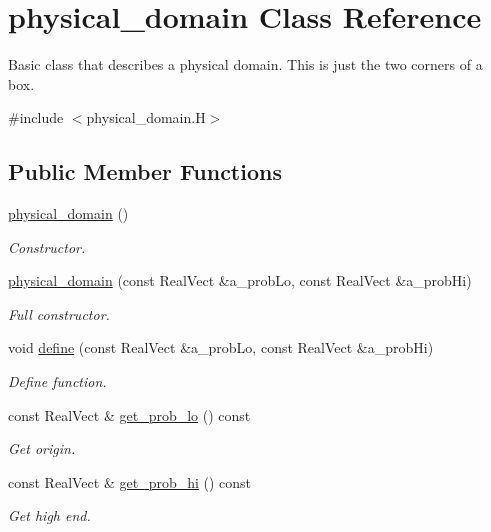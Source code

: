 \hypertarget{classphysical__domain}{}\section{physical\+\_\+domain Class Reference}
\label{classphysical__domain}


Basic class that describes a physical domain. This is just the two corners of a box.  




{\ttfamily \#include $<$physical\+\_\+domain.\+H$>$}

\subsection*{Public Member Functions}
\begin{DoxyCompactItemize}
\item 
\hyperlink{classphysical__domain_a23acf3aefa6dca5518437ede8a053967}{physical\+\_\+domain} ()
\begin{DoxyCompactList}\small\item\em Constructor. \end{DoxyCompactList}\item 
\hyperlink{classphysical__domain_a731464bfb5b2447ab9f5688989a9f633}{physical\+\_\+domain} (const Real\+Vect \&a\+\_\+prob\+Lo, const Real\+Vect \&a\+\_\+prob\+Hi)
\begin{DoxyCompactList}\small\item\em Full constructor. \end{DoxyCompactList}\item 
void \hyperlink{classphysical__domain_aaac3136d103e3dd41a342902a7758ee0}{define} (const Real\+Vect \&a\+\_\+prob\+Lo, const Real\+Vect \&a\+\_\+prob\+Hi)
\begin{DoxyCompactList}\small\item\em Define function. \end{DoxyCompactList}\item 
const Real\+Vect \& \hyperlink{classphysical__domain_a1877b25531755628c7e83e1d8b2a3643}{get\+\_\+prob\+\_\+lo} () const 
\begin{DoxyCompactList}\small\item\em Get origin. \end{DoxyCompactList}\item 
const Real\+Vect \& \hyperlink{classphysical__domain_aa76974d81d24229838ec9a32d490750b}{get\+\_\+prob\+\_\+hi} () const 
\begin{DoxyCompactList}\small\item\em Get high end. \end{DoxyCompactList}\end{DoxyCompactItemize}
